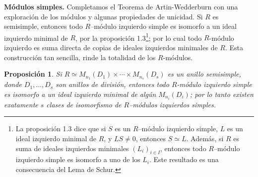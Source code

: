 \documentclass{article}
\newtheorem{proposition}{Proposición}[section]
\begin{document}
\textbf{Módulos simples.}
Completamos el Teorema de Artin-Wedderburn con una exploración de los módulos y algunas propiedades de unicidad.
Si $R$  es semisimple, entonces todo $R$--módulo izquierdo simple es isomorfo a un ideal izquierdo minimal de $R$, por la proposición 1.3\footnote{La proposición 1.3 dice que si $S$ es un $R$--módulo izquierdo simple, $L$ es un ideal izquierdo minimal de $R$, y $L S \neq 0$, entonces $S \simeq L$.
Además, si $R$ es suma de ideales izquierdos minimales $(L_i)_{i \in I}$, entonces todo $R$--módulo izquierdo simple es isomorfo a uno de los $L_i$.
Este resultado es una consecuencia del Lema de Schur.}; por lo cual todo $R$-módulo izquierdo es suma directa de copias de ideales izquierdos minimales de $R$.
Esta construcción tan sencilla, rinde la totalidad de los $R$-módulos.

\begin{proposition}\label{prop:00-module-isomorphism-classes}
    Si $R \simeq M_{n_1}(D_1) \times \cdots \times M_{n_s}(D_s)$ es un anillo semisimple, donde $D_1, \dots, D_s$ son anillos de división, entonces todo $R$-módulo izquierdo simple es isomorfo a un ideal izquierdo minimal de algún $M_{n_i}(D_i)$; por lo tanto existen exatamente $s$ clases de isomorfismo de $R$--módulos izquierdos simples.
\end{proposition}
\end{document}
